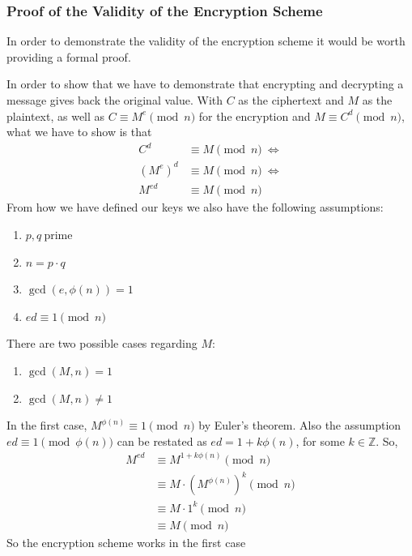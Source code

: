 \documentclass[12pt, titlepage]{article}
\begin{document}
\subsubsection{Proof of the Validity of the Encryption Scheme}

In order to demonstrate the validity of the encryption scheme it would be worth providing a
formal proof. \autocite{so_rsa_proof}

In order to show that we have to demonstrate that encrypting and decrypting a message gives
back the original value. With $C$ as the ciphertext and $M$ as the plaintext, as well as $C
\equiv M^e \pmod{n}$ for the encryption and $M \equiv C^d \pmod{n}$, what we have to show is
that
%
\begin{align*}
    C^d     &\equiv M \pmod{n}\ \iff \\
    (M^e)^d &\equiv M \pmod{n}\ \iff \\
    M^{ed}  &\equiv M \pmod{n}
\end{align*}
%
From how we have defined our keys we also have the following assumptions:
%
\begin{enumerate}
    \item $p,q\ \text{prime}$
    \item $n = p \cdot q$
    \item $\gcd(e, \phi(n)) = 1$ 
    \item $ed \equiv 1 \pmod{n}$
\end{enumerate}
%
There are two possible cases regarding $M$:
%
\begin{enumerate}
    \item $\gcd(M, n) = 1$
    \item $\gcd(M, n) \not= 1$
\end{enumerate}
%
In the first case, $M^{\phi(n)} \equiv 1 \pmod{n}$ by Euler's theorem. Also the assumption
$ed \equiv 1 \pmod{\phi(n)}$ can be restated as $ed = 1 + k\phi(n)$, for some $k \in
\mathbb{Z}$. So, 
%
\begin{align*}
    M^{ed} &\equiv M^{1 + k\phi(n)} \pmod{n} \\
           &\equiv M \cdot (M^{\phi(n)})^k  \pmod{n} \\
           &\equiv M \cdot 1^k \pmod{n} \\
           &\equiv M \pmod{n}
\end{align*}
%
So the encryption scheme works in the first case
\end{document}
